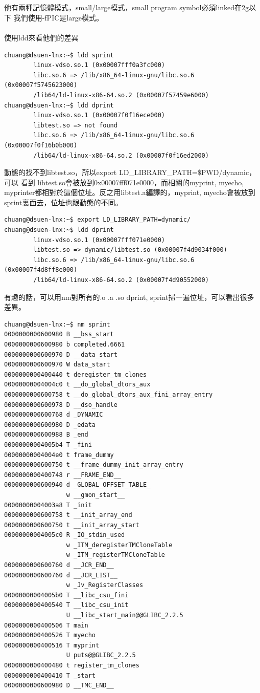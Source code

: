     \\\\
    他有兩種記憶體模式，small/large模式，small program symbol必須linked在2g以下
    我們使用-fPIC是large模式。
    \\\\
    使用ldd來看他們的差異
    \begin{verbatim}
chuang@dsuen-lnx:~$ ldd sprint 
        linux-vdso.so.1 (0x00007fff0a3fc000)
        libc.so.6 => /lib/x86_64-linux-gnu/libc.so.6 (0x00007f5745623000)
        /lib64/ld-linux-x86-64.so.2 (0x00007f57459e6000)
chuang@dsuen-lnx:~$ ldd dprint
        linux-vdso.so.1 (0x00007f0f16ece000)
        libtest.so => not found
        libc.so.6 => /lib/x86_64-linux-gnu/libc.so.6 (0x00007f0f16b0b000)
        /lib64/ld-linux-x86-64.so.2 (0x00007f0f16ed2000)
    \end{verbatim}
    動態的找不到libtest.so，所以export LD\_LIBRARY\_PATH=\$PWD/dynamic，可以
    看到 libtest.so會被放到0x00007fff071e0000，而相關的myprint, myecho, 
    myprinter都相對於這個位址。反之用libtest.a編譯的，myprint, myecho會被放到
    sprint裏面去，位址也跟動態的不同。
    \begin{verbatim}
chuang@dsuen-lnx:~$ export LD_LIBRARY_PATH=dynamic/
chuang@dsuen-lnx:~$ ldd dprint
        linux-vdso.so.1 (0x00007fff071e0000)
        libtest.so => dynamic/libtest.so (0x00007f4d9034f000)
        libc.so.6 => /lib/x86_64-linux-gnu/libc.so.6 (0x00007f4d8ff8e000)
        /lib64/ld-linux-x86-64.so.2 (0x00007f4d90552000)
    \end{verbatim}
    有趣的話，可以用nm對所有的.o .a .so dprint, sprint掃一遍位址，可以看出很多
    差異。
    \begin{verbatim}
chuang@dsuen-lnx:~$ nm sprint
0000000000600980 B __bss_start
0000000000600980 b completed.6661
0000000000600970 D __data_start
0000000000600970 W data_start
0000000000400440 t deregister_tm_clones
00000000004004c0 t __do_global_dtors_aux
0000000000600758 t __do_global_dtors_aux_fini_array_entry
0000000000600978 D __dso_handle
0000000000600768 d _DYNAMIC
0000000000600980 D _edata
0000000000600988 B _end
00000000004005b4 T _fini
00000000004004e0 t frame_dummy
0000000000600750 t __frame_dummy_init_array_entry
0000000000400748 r __FRAME_END__
0000000000600940 d _GLOBAL_OFFSET_TABLE_
                 w __gmon_start__
00000000004003a8 T _init
0000000000600758 t __init_array_end
0000000000600750 t __init_array_start
00000000004005c0 R _IO_stdin_used
                 w _ITM_deregisterTMCloneTable
                 w _ITM_registerTMCloneTable
0000000000600760 d __JCR_END__
0000000000600760 d __JCR_LIST__
                 w _Jv_RegisterClasses
00000000004005b0 T __libc_csu_fini
0000000000400540 T __libc_csu_init
                 U __libc_start_main@@GLIBC_2.2.5
0000000000400506 T main
0000000000400526 T myecho
0000000000400516 T myprint
                 U puts@@GLIBC_2.2.5
0000000000400480 t register_tm_clones
0000000000400410 T _start
0000000000600980 D __TMC_END__

    \end{verbatim}
